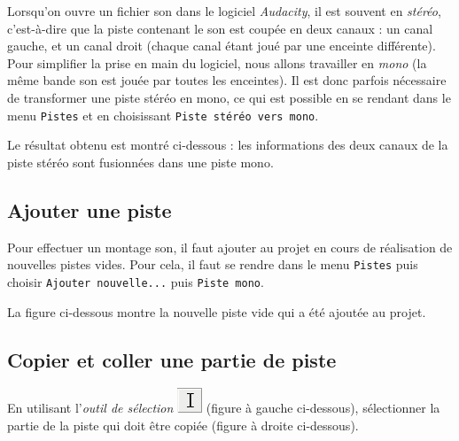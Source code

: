 Lorsqu'on ouvre un fichier son dans le logiciel \emph{Audacity}, il est souvent en \emph{stéréo}, c'est-à-dire que la piste contenant le son est coupée en deux canaux : un canal gauche, et un canal droit (chaque canal étant joué par une enceinte différente). Pour simplifier la prise en main du logiciel, nous allons travailler en \emph{mono} (la même bande son est jouée par toutes les enceintes). Il est donc parfois nécessaire de transformer une piste stéréo en mono, ce qui est possible en se rendant dans le menu \texttt{Pistes} et en choisissant \texttt{Piste stéréo vers mono}.    


Le résultat obtenu est montré ci-dessous : les informations des deux canaux de la piste stéréo sont fusionnées dans une piste mono.





\subsection{Ajouter une piste}\label{Son1ajouterPiste}

Pour effectuer un montage son, il faut ajouter au projet en cours de réalisation de nouvelles pistes vides. Pour cela, il faut se rendre dans le menu \texttt{Pistes} puis choisir \texttt{Ajouter nouvelle...} puis \texttt{Piste mono}.   


La figure ci-dessous montre la nouvelle piste vide qui a été ajoutée au projet.






\subsection{Copier et coller une partie de piste}\label{Son1copierColler} 

En utilisant l'\emph{outil de sélection} \includegraphics[width=.5cm]{./images/son01/audacityIconeSelection} (figure à gauche ci-dessous), sélectionner la partie de la piste qui doit être copiée (figure à droite ci-dessous).

